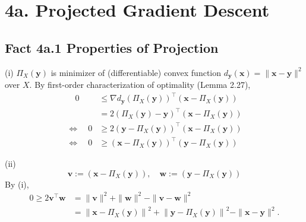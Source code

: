 \section*{4a. Projected Gradient Descent}
\subsection*{Fact 4a.1 Properties of Projection}
(i) $\Pi_{X}(\mathbf{y})$ is minimizer of (differentiable) convex function $d_{\mathbf{y}}(\mathbf{x})=\|\mathbf{x}-\mathbf{y}\|^{2}$ over $X$. By first-order characterization of optimality (Lemma 2.27),
$$
\begin{aligned}
\quad 0 & \leq \nabla d_{\mathbf{y}}\left(\Pi_{X}(\mathbf{y})\right)^{\top}\left(\mathbf{x}-\Pi_{X}(\mathbf{y})\right) \\
&=2\left(\Pi_{X}(\mathbf{y})-\mathbf{y}\right)^{\top}\left(\mathbf{x}-\Pi_{X}(\mathbf{y})\right) \\
\Leftrightarrow \quad 0 & \geq 2\left(\mathbf{y}-\Pi_{X}(\mathbf{y})\right)^{\top}\left(\mathbf{x}-\Pi_{X}(\mathbf{y})\right) \\
\Leftrightarrow \quad 0 & \geq\left(\mathbf{x}-\Pi_{X}(\mathbf{y})\right)^{\top}\left(\mathbf{y}-\Pi_{X}(\mathbf{y})\right)
\end{aligned}
$$

(ii)
$$
\mathbf{v}:=\left(\mathbf{x}-\Pi_{X}(\mathbf{y})\right), \quad \mathbf{w}:=\left(\mathbf{y}-\Pi_{X}(\mathbf{y})\right)
$$
By (i),
$$
\begin{aligned}
0 \geq 2 \mathbf{v}^{\top} \mathbf{w} &=\|\mathbf{v}\|^{2}+\|\mathbf{w}\|^{2}-\|\mathbf{v}-\mathbf{w}\|^{2} \\
&=\left\|\mathbf{x}-\Pi_{X}(\mathbf{y})\right\|^{2}+\left\|\mathbf{y}-\Pi_{X}(\mathbf{y})\right\|^{2}-\|\mathbf{x}-\mathbf{y}\|^{2} .
\end{aligned}
$$



